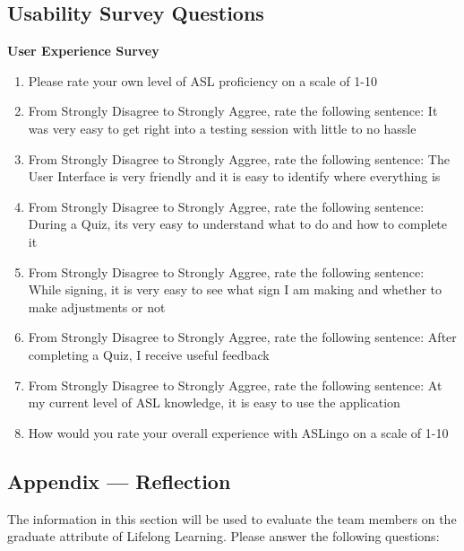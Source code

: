 \documentclass[12pt, titlepage]{article}
\begin{document}
\subsection{Usability Survey Questions}

\textbf{User Experience Survey}\label{appen}

\begin{enumerate}

\item Please rate your own level of ASL proficiency on a scale of 1-10 \newline [ 1 = I know absolutely nothing, 10 = I sign at a high level]
\item From Strongly Disagree to Strongly Aggree, rate the following sentence: It was very easy to get right into a testing session with little to no hassle
\item From Strongly Disagree to Strongly Aggree, rate the following sentence: The User Interface is very friendly and it is easy to identify where everything is
\item From Strongly Disagree to Strongly Aggree, rate the following sentence: During a Quiz, its very easy to understand what to do and how to complete it
\item From Strongly Disagree to Strongly Aggree, rate the following sentence: While signing, it is very easy to see what sign I am making and whether to make adjustments or not
\item From Strongly Disagree to Strongly Aggree, rate the following sentence:  After completing a Quiz,  I receive useful feedback
\item From Strongly Disagree to Strongly Aggree, rate the following sentence: At my current level of ASL knowledge, it is easy to use the application
\item How would you rate your overall experience with ASLingo on a scale of 1-10 \newline [ 1 = Terrible, 10 = Fantastic]
\end{enumerate}

\subsection{Appendix --- Reflection}


The information in this section will be used to evaluate the team members on the
graduate attribute of Lifelong Learning.  Please answer the following questions:
\end{document}
